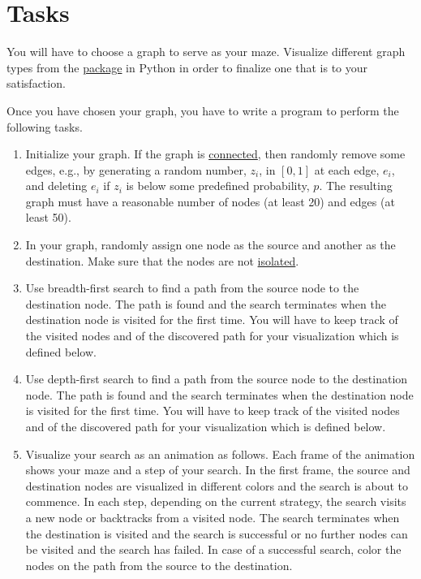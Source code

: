 \documentclass[a4paper]{exam}
\begin{document}
\section*{Tasks}

You will have to choose a graph to serve as your maze. Visualize different graph types from the \href{https://networkx.org/documentation/stable/reference/generators.html}{ package} in Python in order to finalize one that is to your satisfaction.

Once you have chosen your graph, you have to write a program to perform the following tasks.
  \begin{enumerate}
  \item Initialize your graph. If the graph is \href{https://mathworld.wolfram.com/ConnectedGraph.html}{connected}, then randomly remove some edges, e.g., by generating a random number, $z_i$, in $[0,1]$ at each edge, $e_i$, and deleting $e_i$ if $z_i$ is below some predefined probability, $p$. The resulting graph must have a reasonable number of nodes (at least 20) and edges (at least 50).
  \item In your graph, randomly assign one node as the source and another as the destination. Make sure that the nodes are not \href{https://en.wikipedia.org/wiki/Vertex_(graph_theory)#Types_of_vertices}{isolated}.
  \item Use breadth-first search to find a path from the source node to the destination node. The path is found and the search terminates when the destination node is visited for the first time. You will have to keep track of the visited nodes and of the discovered path for your visualization which is defined below.
  \item Use depth-first search to find a path from the source node to the destination node. The path is found and the search terminates when the destination node is visited for the first time. You will have to keep track of the visited nodes and of the discovered path for your visualization which is defined below.
  \item Visualize your search as an animation as follows. Each frame of the animation shows your maze and a step of your search. In the first frame, the source and destination nodes are visualized in different colors and the search is about to commence. In each step, depending on the current strategy, the search visits a new node or backtracks from a visited node. The search terminates when the destination is visited and the search is successful or no further nodes can be visited and the search has failed. In case of a successful search, color the nodes on the path from the source to the destination.
  \end{enumerate}
\end{document}
